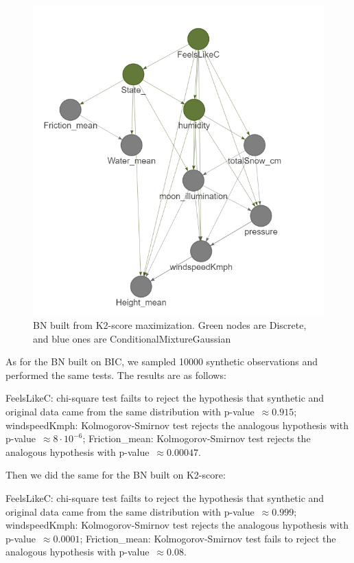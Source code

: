 \documentclass[12pt, bachelor, substylefile = algo_title.rtx]{disser}
\theoremstyle{definition}
\begin{document}
\begin{figure}[!h]
\centering
   \begin{minipage}{0.7\textwidth}
     \includegraphics[width=\linewidth]{bn2}
   \end{minipage}
\caption{BN built from K2-score maximization. Green nodes are Discrete, and blue ones are ConditionalMixtureGaussian}
\label{fig: 9}
\end{figure}

As for the BN built on BIC, we sampled 10000 synthetic observations and performed the same tests. The results are as follows:
\begin{outline}
\1 FeelsLikeC: chi-square test failts to reject the hypothesis that synthetic and original data came from the same distribution with p-value~$\approx 0.915$;
\1 windspeedKmph: Kolmogorov-Smirnov test rejects the analogous hypothesis with p-value~$ \approx 8\cdot 10^{-6}$;
\1 Friction\_mean: Kolmogorov-Smirnov test rejects the analogous hypothesis with p-value~$ \approx 0.00047$.
\end{outline}

Then we did the same for the BN built on K2-score:
\begin{outline}
\1 FeelsLikeC: chi-square test failts to reject the hypothesis that synthetic and original data came from the same distribution with p-value~$ \approx 0.999$;
\1 windspeedKmph: Kolmogorov-Smirnov test rejects the analogous hypothesis with p-value~$\approx 0.0001$;
\1 Friction\_mean: Kolmogorov-Smirnov test fails to reject the analogous hypothesis with p-value~$ \approx 0.08$.
\end{outline}
\end{document}

